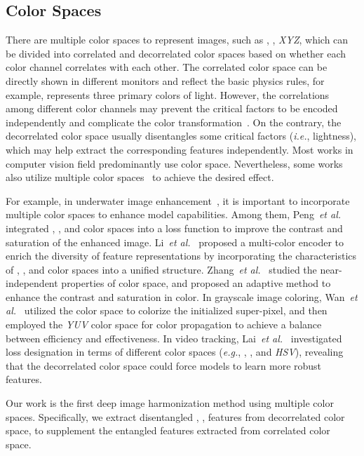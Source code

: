 \documentclass[sigconf]{acmart}
\begin{document}
\subsection{Color Spaces}
There are multiple color spaces to represent images, such as , , \textit{XYZ}, which can be divided into correlated and decorrelated color spaces based on whether each color channel correlates with each other. 
The correlated color space can be directly shown in different monitors and reflect the basic physics rules, for example,  represents three primary colors of light.
However, the correlations among different color channels may prevent the critical factors to be encoded independently and complicate the color transformation~\cite{reinhard2001color}.
On the contrary, the decorrelated color space usually disentangles some critical factors (\emph{i.e.}, lightness), which may help extract the corresponding features independently.
Most works in computer vision field predominantly use  color space. 
Nevertheless, some works also utilize multiple color spaces~\cite{peng2023u, li2021underwater} to achieve the desired effect. 

For example, in underwater image enhancement~\cite{peng2023u, li2021underwater, ma2022wavelet, zhang2022underwater}, it is important to incorporate multiple color spaces to enhance model capabilities.
Among them, Peng~\emph{et al.}\cite{peng2023u} integrated , , and  color spaces into a loss function to improve the contrast and saturation of the enhanced image. 
Li~\emph{et al.}~\cite{li2021underwater} proposed a multi-color encoder to enrich the diversity of feature representations by incorporating the characteristics of , , and  color spaces into a unified structure. 
Zhang~\emph{et al.}~\cite{zhang2022underwater} studied the near-independent properties of  color space, and proposed an adaptive method to enhance the contrast and saturation in  color.
In grayscale image coloring, Wan~\emph{et al.}~\cite{wan2020automated} utilized the  color space to colorize the initialized super-pixel, and then employed the \textit{YUV} color space for color propagation to achieve a balance between efficiency and effectiveness. 
In video tracking, Lai~\emph{et al.}~\cite{lai2020mast} investigated loss designation in terms of different color spaces (\emph{e.g.}, , , and \textit{HSV}), revealing that the decorrelated color space could force models to learn more robust features.

Our work is the first deep image harmonization method using multiple color spaces. Specifically, we extract disentangled , ,  features from decorrelated  color space, to supplement the entangled  features extracted from correlated  color space. 
\end{document}
